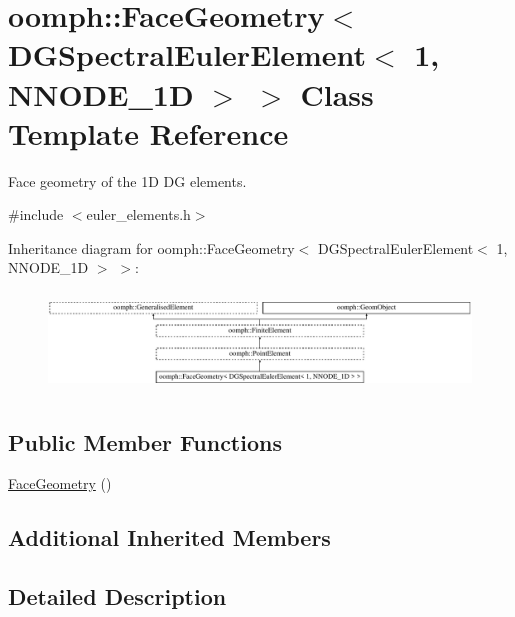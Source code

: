 \hypertarget{classoomph_1_1FaceGeometry_3_01DGSpectralEulerElement_3_011_00_01NNODE__1D_01_4_01_4}{}\section{oomph\+:\+:Face\+Geometry$<$ D\+G\+Spectral\+Euler\+Element$<$ 1, N\+N\+O\+D\+E\+\_\+1D $>$ $>$ Class Template Reference}
\label{classoomph_1_1FaceGeometry_3_01DGSpectralEulerElement_3_011_00_01NNODE__1D_01_4_01_4}


Face geometry of the 1D DG elements.  




{\ttfamily \#include $<$euler\+\_\+elements.\+h$>$}

Inheritance diagram for oomph\+:\+:Face\+Geometry$<$ D\+G\+Spectral\+Euler\+Element$<$ 1, N\+N\+O\+D\+E\+\_\+1D $>$ $>$\+:\begin{figure}[H]
\begin{center}
\leavevmode
\includegraphics[height=2.685851cm]{classoomph_1_1FaceGeometry_3_01DGSpectralEulerElement_3_011_00_01NNODE__1D_01_4_01_4}
\end{center}
\end{figure}
\subsection*{Public Member Functions}
\begin{DoxyCompactItemize}
\item 
\hyperlink{classoomph_1_1FaceGeometry_3_01DGSpectralEulerElement_3_011_00_01NNODE__1D_01_4_01_4_a62891e42b176cb7a757ca315d962a988}{Face\+Geometry} ()
\end{DoxyCompactItemize}
\subsection*{Additional Inherited Members}


\subsection{Detailed Description}
